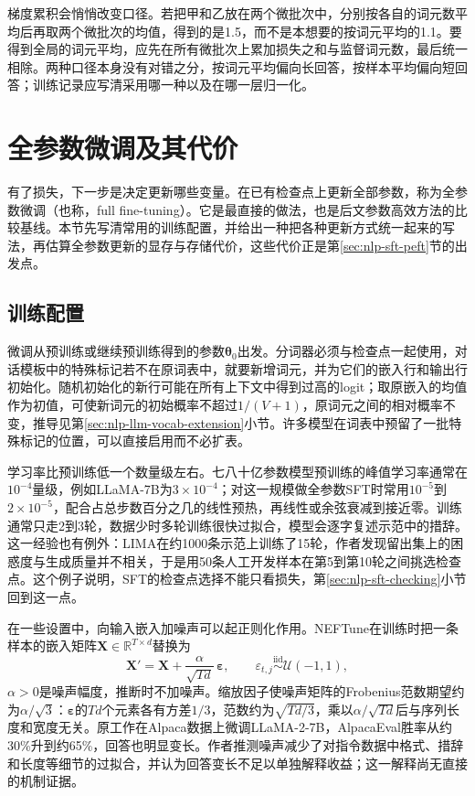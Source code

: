 梯度累积会悄悄改变口径。若把甲和乙放在两个微批次中，分别按各自的词元数平均后再取两个微批次的均值，得到的是1.5，而不是本想要的按词元平均的1.1。要得到全局的词元平均，应先在所有微批次上累加损失之和与监督词元数，最后统一相除。两种口径本身没有对错之分，按词元平均偏向长回答，按样本平均偏向短回答；训练记录应写清采用哪一种以及在哪一层归一化。

\section{全参数微调及其代价}
\label{sec:nlp-sft-updates}

有了损失，下一步是决定更新哪些变量。在已有检查点上更新全部参数，称为全参数微调（也称，full fine-tuning）。它是最直接的做法，也是后文参数高效方法的比较基线。本节先写清常用的训练配置，并给出一种把各种更新方式统一起来的写法，再估算全参数更新的显存与存储代价，这些代价正是第\ref{sec:nlp-sft-peft}节的出发点。

\subsection{训练配置}
\label{sec:nlp-sft-parameter-scope}

微调从预训练或继续预训练得到的参数$\bm\theta_0$出发。分词器必须与检查点一起使用，对话模板中的特殊标记若不在原词表中，就要新增词元，并为它们的嵌入行和输出行初始化。随机初始化的新行可能在所有上下文中得到过高的logit；取原嵌入的均值作为初值，可使新词元的初始概率不超过$1/(V+1)$，原词元之间的相对概率不变，推导见第\ref{sec:nlp-llm-vocab-extension}小节。许多模型在词表中预留了一批特殊标记的位置，可以直接启用而不必扩表。

学习率比预训练低一个数量级左右。七八十亿参数模型预训练的峰值学习率通常在$10^{-4}$量级，例如LLaMA-7B为$3\times10^{-4}$\cite{touvron2023llama}；对这一规模做全参数SFT时常用$10^{-5}$到$2\times10^{-5}$，配合占总步数百分之几的线性预热，再线性或余弦衰减到接近零。训练通常只走2到3轮，数据少时多轮训练很快过拟合，模型会逐字复述示范中的措辞。这一经验也有例外：LIMA在约1000条示范上训练了15轮，作者发现留出集上的困惑度与生成质量并不相关，于是用50条人工开发样本在第5到第10轮之间挑选检查点。这个例子说明，SFT的检查点选择不能只看损失，第\ref{sec:nlp-sft-checking}小节回到这一点。

在一些设置中，向输入嵌入加噪声可以起正则化作用。NEFTune在训练时把一条样本的嵌入矩阵$\bm X\in\mathbb R^{T\times d}$替换为
\begin{equation}
 \bm X'=\bm X+\frac{\alpha}{\sqrt{Td}}\,\bm\varepsilon,
 \qquad \varepsilon_{t,j}\overset{\mathrm{iid}}{\sim}\mathcal U(-1,1),
 \label{eq:nlp-sft-neftune}
\end{equation}
$\alpha>0$是噪声幅度，推断时不加噪声。缩放因子使噪声矩阵的Frobenius范数期望约为$\alpha/\sqrt3$：$\bm\varepsilon$的$Td$个元素各有方差$1/3$，范数约为$\sqrt{Td/3}$，乘以$\alpha/\sqrt{Td}$后与序列长度和宽度无关。原工作在Alpaca数据上微调LLaMA-2-7B，AlpacaEval胜率从约30\%升到约65\%，回答也明显变长。作者推测噪声减少了对指令数据中格式、措辞和长度等细节的过拟合，并认为回答变长不足以单独解释收益；这一解释尚无直接的机制证据。

